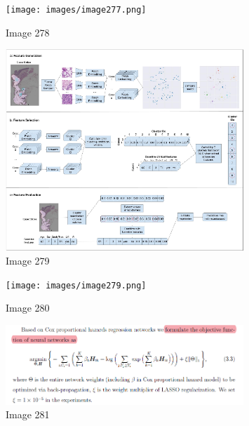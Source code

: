 \documentclass{article}%
\begin{document}
%


\begin{figure}[h!]%
\centering%
\texttt{[image: images/image277.png]}%
\caption{Image 278}%
\end{figure}

%


\begin{figure}[h!]%
\centering%
\includegraphics[width=0.8\textwidth]{images/image278.png}%
\caption{Image 279}%
\end{figure}

%


\begin{figure}[h!]%
\centering%
\texttt{[image: images/image279.png]}%
\caption{Image 280}%
\end{figure}

%


\begin{figure}[h!]%
\centering%
\includegraphics[width=0.8\textwidth]{images/image280.png}%
\caption{Image 281}%
\end{figure}

%
\end{document}
